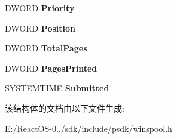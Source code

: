 \begin{DoxyCompactItemize}
\mbox{\label{struct___j_o_b___i_n_f_o__1_w_a125abe73f91f97b502c977e82b4a5c0c}} 
D\+W\+O\+RD {\bfseries Priority}
\item 
\mbox{\label{struct___j_o_b___i_n_f_o__1_w_a91bbb80f81df010ff499a6abcd3febd8}} 
D\+W\+O\+RD {\bfseries Position}
\item 
\mbox{\label{struct___j_o_b___i_n_f_o__1_w_a14761f07e43034b5b629163e8fe9b772}} 
D\+W\+O\+RD {\bfseries Total\+Pages}
\item 
\mbox{\label{struct___j_o_b___i_n_f_o__1_w_ac078a8e473fa38b2c7e063c04b18b5ff}} 
D\+W\+O\+RD {\bfseries Pages\+Printed}
\item 
\mbox{\label{struct___j_o_b___i_n_f_o__1_w_ac83407ed63ffaa8b9318db30424c04d1}} 
\hyperlink{struct___s_y_s_t_e_m_t_i_m_e}{S\+Y\+S\+T\+E\+M\+T\+I\+ME} {\bfseries Submitted}
\end{DoxyCompactItemize}


该结构体的文档由以下文件生成\+:\begin{DoxyCompactItemize}
\item 
E\+:/\+React\+O\+S-\/0../sdk/include/psdk/winspool.\+h\end{DoxyCompactItemize}
